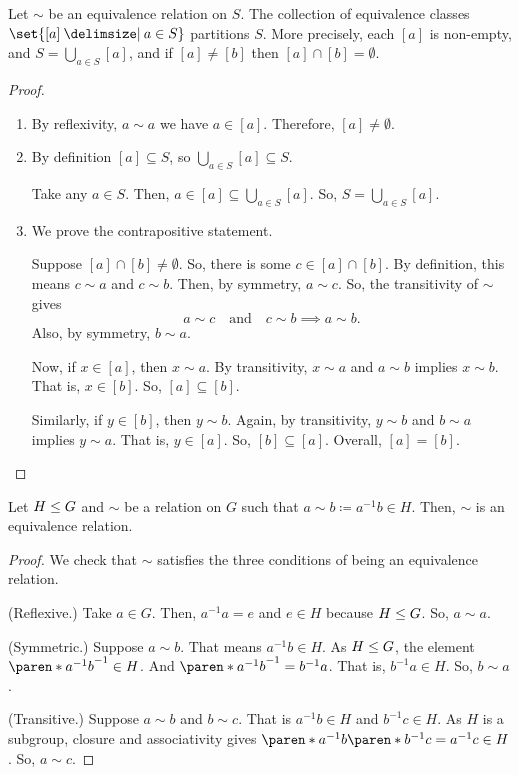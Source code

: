 \documentclass[11pt]{penrose}
\begin{document}
\begin{nthm}
    Let $\sim$ be an equivalence relation on $S$. The collection of equivalence classes $\set{[a] \st a \in S}$ partitions $S$. More precisely, each $[a]$ is non-empty, and $S = \bigcup_{a \in S} [a]$, and if $[a] \neq [b]$ then $[a] \cap [b] = \emptyset$.
\end{nthm}
\begin{proof}\phantom{}
    \begin{enumerate}
        \item By reflexivity, $a \sim a$ we have $a \in [a]$. Therefore, $[a] \neq \emptyset$.

        \item By definition $[a] \subseteq S$, so $\bigcup_{a \in S} [a] \subseteq S$.

        Take any $a \in S$. Then, $a \in [a] \subseteq \bigcup_{a \in S} [a]$. So, $S = \bigcup_{a \in S} [a]$.

        \item We prove the contrapositive statement.

        Suppose $[a] \cap [b] \neq \emptyset$. So, there is some $c \in [a] \cap [b]$. By definition, this means $c \sim a$ and $c \sim b$. Then, by symmetry, $a \sim c$. So, the transitivity of $\sim$ gives
        \begin{equation*}
            a \sim c \quad\text{and}\quad c \sim b \implies a \sim b.
        \end{equation*}
        Also, by symmetry, $b \sim a$.

        Now, if $x \in [a]$, then $x \sim a$. By transitivity, $x \sim a$ and $a \sim b$ implies $x \sim b$. That is, $x \in [b]$. So, $[a] \subseteq [b]$.

        Similarly, if $y \in [b]$, then $y \sim b$. Again, by transitivity, $y \sim b$ and $b \sim a$ implies $y \sim a$. That is, $y \in [a]$. So, $[b] \subseteq [a]$. Overall, $[a] = [b]$.\qedhere
    \end{enumerate}
\end{proof}

\begin{nthm}
    Let $H \mathrel{\leq} G$ and $\sim$ be a relation on $G$ such that $a \sim b \coloneq a^{-1} b \in H$. Then, $\sim$ is an equivalence relation.
\end{nthm}
\begin{proof}
    We check that $\sim$ satisfies the three conditions of being an equivalence relation.
    
    (Reflexive.) Take $a \in G$. Then, $a^{-1} a = e$ and $e \in H$ because $H \mathrel{\leq} G$. So, $a \sim a$.

    (Symmetric.) Suppose $a \sim b$. That means $a^{-1} b \in H$. As $H \mathrel{\leq} G$, the element $\paren*{a^{-1} b}^{-1} \in H$. And $\paren*{a^{-1} b}^{-1} = b^{-1} a$. That is, $b^{-1} a \in H$. So, $b \sim a$.

    (Transitive.) Suppose $a \sim b$ and $b \sim c$. That is $a^{-1} b \in H$ and $b^{-1} c \in H$. As $H$ is a subgroup, closure and associativity gives $\paren*{a^{-1} b} \paren*{b^{-1} c} = a^{-1} c \in H$. So, $a \sim c$. \qedhere
\end{proof}
\end{document}
